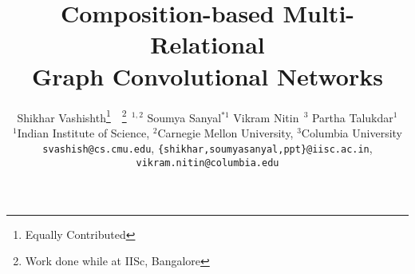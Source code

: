 \documentclass{article} \usepackage{iclr2020_conference,times}
\title{Composition-based Multi-Relational \\ Graph Convolutional Networks}
\author{Shikhar Vashishth\thanks{Equally Contributed}~~\thanks{Work done while at IISc, Bangalore}$\ \ ^{1,2}$ \quad Soumya Sanyal$^{*1}$ \quad Vikram Nitin\footnotemark[2]$\ \ ^{3}$ \quad Partha Talukdar$^{1}$\\
	$^{1}$Indian Institute of Science, $^{2}$Carnegie Mellon University, $^{3}$Columbia University\\
	\small \texttt{svashish@cs.cmu.edu}, \small  \texttt{\{shikhar,soumyasanyal,ppt\}@iisc.ac.in}, \\ \small \texttt{vikram.nitin@columbia.edu}
}
\begin{document}
\newcommand{\refalg}[1]{Algorithm \ref{#1}}
\newcommand{\refeqn}[1]{Equation \ref{#1}}
\newcommand{\reffig}[1]{Figure \ref{#1}}
\newcommand{\reftbl}[1]{Table \ref{#1}}
\newcommand{\refsec}[1]{Section \ref{#1}}





\newcommand{\add}[1]{\textcolor{red}{#1}\typeout{#1}}
\newcommand{\remove}[1]{\sout{#1}\typeout{#1}}

\newcommand{\m}[1]{\mathcal{#1}}
\newcommand{\bmm}[1]{\bm{\mathcal{#1}}}
\newcommand{\real}[1]{\mathbb{R}^{#1}}
\newcommand{\method}{\textsc{CompGCN}}

\newcommand{\bleuone}{BLEU${_1}$\xspace}
\newcommand{\bleu}{BLEU${_4}$\xspace}

\newcommand{\problem}{DD}
\newcommand{\problemfull}{Document Dating}

\newtheorem{theorem}{Theorem}[section]
\newtheorem{claim}[theorem]{Claim}

\newcommand{\reminder}[1]{\textcolor{red}{[[ #1 ]]}\typeout{#1}}
\newcommand{\reminderR}[1]{\textcolor{gray}{[[ #1 ]]}\typeout{#1}}


\newcommand{\tensor}{\mathcal{X}}
\newcommand{\Real}{\mathbb{R}}

\newcommand{\tuples}{\mathbb{T}}

\newcommand\norm[1]{\left\lVert#1\right\rVert}

\newcommand{\note}[1]{\textcolor{blue}{#1}}

\newcommand*{\Scale}[2][4]{\scalebox{#1}{$#2$}}\newcommand*{\Resize}[2]{\resizebox{#1}{!}{$#2$}}

\def\mat#1{\mbox{\bf #1}}

\newcommand{\datafb}{FB15k}
\newcommand{\datawn}{WN18}
\newcommand{\datafbn}{FB15k-237}
\newcommand{\datawnn}{WN18RR}
\newcommand{\datayago}{YAGO3-10}

\theoremstyle{definition}
\newtheorem{definition}{Definition}[section]
 
\theoremstyle{proposition}
\newtheorem{proposition}{Proposition}[section]
\newtheorem*{lemma*}{Lemma}

 
\maketitle
\end{document}
